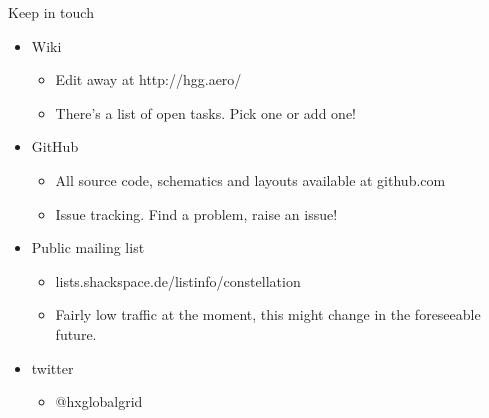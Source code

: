 	\begin{frame}{Keep in touch}
		\begin{itemize}
			\item Wiki
			\begin{itemize}
				\item Edit away at http://hgg.aero/
				\item There's a list of open tasks.  Pick one or add one!
			\end{itemize}

			\item GitHub
			\begin{itemize}
				\item All source code, schematics and layouts available at github.com
				\item Issue tracking.  Find a problem, raise an issue!
			\end{itemize}

			\item Public mailing list
			\begin{itemize}
				\item lists.shackspace.de/listinfo/constellation
				\item Fairly low traffic at the moment, this might change in the foreseeable future.
			\end{itemize}

			\item twitter
			\begin{itemize}
				\item @hxglobalgrid
			\end{itemize}
		\end{itemize}
	\end{frame}

